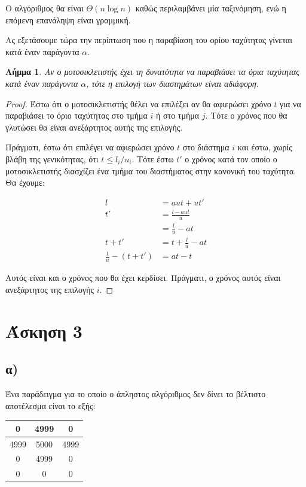 \documentclass[11pt,a4paper]{book}
\newtheorem*{lemma}{Λήμμα}
\begin{document}
Ο αλγόριθμος θα είναι $\Theta( n \log{n} )$ καθώς περιλαμβάνει μία ταξινόμηση, ενώ η επόμενη επανάληψη είναι γραμμική.

Ας εξετάσουμε τώρα την περίπτωση που η παραβίαση του ορίου ταχύτητας γίνεται κατά έναν παράγοντα $\alpha$.

\begin{lemma}
Αν ο μοτοσικλετιστής έχει τη δυνατότητα να παραβιάσει τα όρια ταχύτητας κατά έναν παράγοντα $\alpha$, τότε η επιλογή των διαστημάτων είναι αδιάφορη.
\end{lemma}
\begin{proof}
Έστω ότι ο μοτοσικλετιστής θέλει να επιλέξει αν θα αφιερώσει χρόνο $t$ για να παραβιάσει το όριο ταχύτητας στο τμήμα $i$ ή στο τμήμα $j$. Τότε ο χρόνος που θα γλυτώσει θα είναι ανεξάρτητος αυτής της επιλογής.

Πράγματι, έστω ότι επιλέγει να αφιερώσει χρόνο $t$ στο διάστημα $i$ και έστω, χωρίς βλάβη της γενικότητας, ότι $t \leq l_i / u_i$. Τότε έστω $t'$ ο χρόνος κατά τον οποίο ο μοτοσικλετιστής διασχίζει ένα τμήμα του διαστήματος στην κανονική του ταχύτητα. Θα έχουμε:

\begin{align*}
 l &= aut + ut'\\
t' &= \frac{l - aut}{u}\\
   &= \frac{l}{u} - at\\
t + t' &= t + \frac{l}{u} - at\\
\frac{l}{u} - (t + t') &= at - t
\end{align*}

Αυτός είναι και ο χρόνος που θα έχει κερδίσει. Πράγματι, ο χρόνος αυτός είναι ανεξάρτητος της επιλογής $i$.
\end{proof}

\section*{Άσκηση 3}
\subsection*{α)}
Ένα παράδειγμα για το οποίο ο άπληστος αλγόριθμος δεν δίνει το βέλτιστο αποτέλεσμα είναι το εξής:

\vspace{3mm}
\begin{doublespace}
\begin{tabular}{|c|c|c|}
	\hline
	0    & 4999 & 0    \\ \hline
	4999 & 5000 & 4999 \\ \hline
	0    & 4999 & 0    \\ \hline
	0    &    0 & 0    \\ \hline
\end{tabular}
\end{doublespace}
\vspace{3mm}
\end{document}
